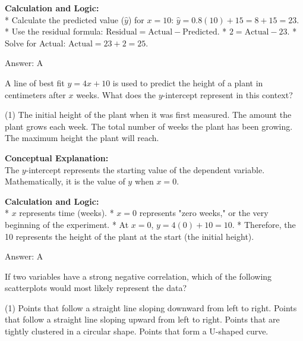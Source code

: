 \documentclass[11pt,paper=a4,answers]{exam}
\begin{document}
\begin{questions}
\begin{solution}
\vspace{30pt}

\textbf{Calculation and Logic:} \\
* Calculate the predicted value ($\hat{y}$) for $x = 10$:
  $\hat{y} = 0.8(10) + 15 = 8 + 15 = 23$.
* Use the residual formula: $\text{Residual} = \text{Actual} - \text{Predicted}$.
* $2 = \text{Actual} - 23$.
* Solve for Actual: $\text{Actual} = 23 + 2 = 25$.

\vspace{30pt}

Answer: \colorbox{yellow!100}{A}
\end{solution}

\vspace{60pt}

\question
A line of best fit $y = 4x + 10$ is used to predict the height of a plant in centimeters after $x$ weeks. What does the $y$-intercept represent in this context?
\begin{tasks}(1)
    \task The initial height of the plant when it was first measured.
    \task The amount the plant grows each week.
    \task The total number of weeks the plant has been growing.
    \task The maximum height the plant will reach.
\end{tasks}

\begin{solution}
\textbf{Conceptual Explanation:} \\
The $y$-intercept represents the starting value of the dependent variable. Mathematically, it is the value of $y$ when $x = 0$.

\vspace{30pt}

\textbf{Calculation and Logic:} \\
* $x$ represents time (weeks).
* $x = 0$ represents "zero weeks," or the very beginning of the experiment.
* At $x = 0$, $y = 4(0) + 10 = 10$.
* Therefore, the 10 represents the height of the plant at the start (the initial height).

\vspace{30pt}

Answer: \colorbox{yellow!100}{A}
\end{solution}

\vspace{60pt}

\question
If two variables have a strong negative correlation, which of the following scatterplots would most likely represent the data?
\begin{tasks}(1)
    \task Points that follow a straight line sloping downward from left to right.
    \task Points that follow a straight line sloping upward from left to right.
    \task Points that are tightly clustered in a circular shape.
    \task Points that form a U-shaped curve.
\end{tasks}


\end{questions}
\end{document}
